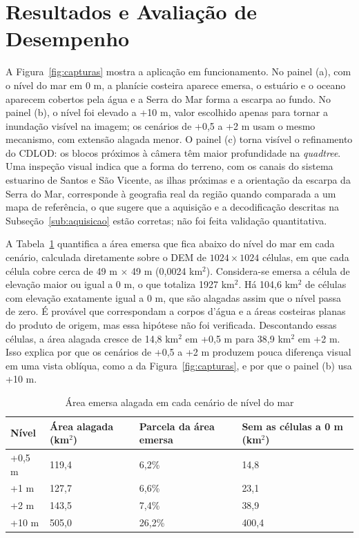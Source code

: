\documentclass[conference]{IEEEtran}
\newcommand{\fonte}[1]{\par\vspace{2pt}{\footnotesize Fonte: #1\par}}
\begin{document}
\section{Resultados e Avaliação de Desempenho}
\label{sec:resultados}

A Figura~\ref{fig:capturas} mostra a aplicação em funcionamento. No painel
(a), com o nível do mar em 0 m, a planície costeira aparece emersa, o
estuário e o oceano aparecem cobertos pela água e a Serra do Mar forma a
escarpa ao fundo. No painel (b), o nível
foi elevado a +10 m, valor escolhido apenas para tornar a inundação
visível na imagem; os cenários de +0,5 a +2 m usam o mesmo mecanismo, com
extensão alagada menor. O painel (c) torna visível o refinamento do CDLOD:
os blocos próximos à câmera têm maior profundidade na \emph{quadtree}. Uma
inspeção visual indica que a forma do terreno, com os canais do sistema
estuarino de Santos e São Vicente, as ilhas próximas e a orientação da
escarpa da Serra do Mar, corresponde à geografia real da região quando
comparada a um mapa de referência, o que sugere que a aquisição e a
decodificação descritas na Subseção~\ref{sub:aquisicao} estão corretas;
não foi feita validação quantitativa.

A Tabela~\ref{tab:area} quantifica a área emersa que fica abaixo do nível
do mar em cada cenário, calculada diretamente sobre o DEM de $1024 \times
1024$ células, em que cada célula cobre cerca de 49 m $\times$ 49 m
(0,0024 km$^2$). Considera-se emersa a célula de elevação maior ou igual a
0 m, o que totaliza 1927 km$^2$. Há 104,6 km$^2$ de células com elevação
exatamente igual a 0 m, que são alagadas assim que o nível passa de zero.
É provável que correspondam a corpos d'água e a áreas costeiras planas do
produto de origem, mas essa hipótese não foi verificada. Descontando essas
células, a área alagada cresce de 14,8 km$^2$ em +0,5 m para 38,9 km$^2$ em
+2 m. Isso explica por que os cenários de +0,5 a +2 m produzem pouca
diferença visual em uma vista oblíqua, como a da Figura~\ref{fig:capturas},
e por que o painel (b) usa +10 m.

\begin{table}[t]
\caption{Área emersa alagada em cada cenário de nível do mar}
\label{tab:area}
\centering
\begin{tabular}{@{}p{1.3cm}p{1.9cm}p{2.0cm}p{2.3cm}@{}}
\toprule
\textbf{Nível} & \textbf{Área alagada (km$^2$)} & \textbf{Parcela da área emersa} & \textbf{Sem as células a 0 m (km$^2$)} \\
\midrule
+0,5 m & 119,4 & 6,2\% & 14,8 \\
+1 m   & 127,7 & 6,6\% & 23,1 \\
+2 m   & 143,5 & 7,4\% & 38,9 \\
+10 m  & 505,0 & 26,2\% & 400,4 \\
\bottomrule
\end{tabular}
\fonte{Elaborado pelos autores (2026), a partir do DEM de 1024 $\times$ 1024
células. Área emersa: células com elevação maior ou igual a 0 m (1927
km$^2$).}
\end{table}
\end{document}
